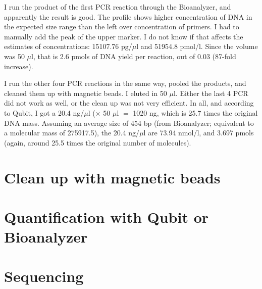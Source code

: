 \documentclass[a4paper,12pt]{article}
\begin{document}
I run the product of the first PCR reaction through the Bioanalyzer, and apparently the result is good. The profile shows higher concentration of DNA in the expected size range than the left over concentration of primers. I had to manually add the peak of the upper marker. I do not know if that affects the estimates of concentrations: 15107.76 pg/$\mu$l and 51954.8 pmol/l. Since the volume was 50 $\mu$l, that is 2.6 pmols of DNA yield per reaction, out of 0.03 (87-fold increase).

I run the other four PCR reactions in the same way, pooled the products, and cleaned them up with magnetic beads. I eluted in 50 $\mu$l. Either the last 4 PCR did not work as well, or the clean up was not very efficient. In all, and according to Qubit, I got a 20.4 ng/$\mu$l ($\times$ 50 $\mu$l $=$ 1020 ng, which is 25.7 times the original DNA mass. Assuming an average size of 454 bp (from Bioanalyzer; equivalent to a molecular mass of 275917.5), the 20.4 ng/$\mu$l are 73.94 nmol/l, and 3.697 pmols (again, around 25.5 times the original number of molecules).

\section{Clean up with magnetic beads}

\section{Quantification with Qubit or Bioanalyzer}

\section{Sequencing}


\end{document}
